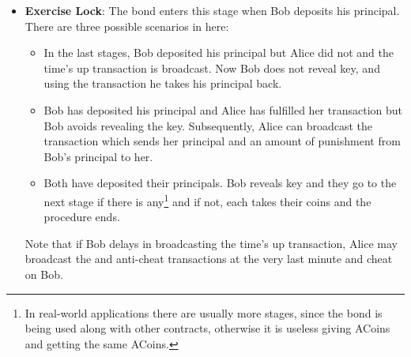 \begin{itemize}
    \item \textbf{Exercise Lock}: The bond enters this stage when Bob deposits his principal. There are three possible scenarios in here:
    \begin{itemize}
        \item In the last stages, Bob deposited his principal but Alice did not and the time's up transaction is broadcast. Now Bob does not reveal \keyone key, and using the  transaction he takes his principal back.
        
        \item Bob has deposited his principal and Alice has fulfilled her  transaction but Bob avoids revealing the \keyone key. Subsequently, Alice can broadcast the  transaction which sends her principal and an amount of punishment from Bob's principal to her. 
        
        \item Both have deposited their principals. Bob reveals \keyone key and they go to the next stage if there is any\footnote{In real-world applications there are usually more stages, since the bond is being used along with other contracts, otherwise it is useless giving ACoins and getting the same ACoins.} and if not, each takes their coins and the procedure ends.
    \end{itemize}

    Note that if Bob delays in broadcasting the time's up transaction, Alice may broadcast the  and anti-cheat transactions at the very last minute and cheat on Bob.

\end{itemize}
